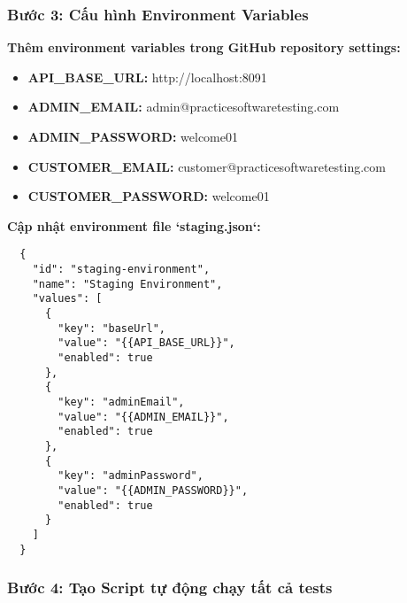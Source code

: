 \documentclass[12pt,a4paper]{article}
\begin{document}
  \subsubsection{Bước 3: Cấu hình Environment Variables}

  \textbf{Thêm environment variables trong GitHub repository settings:}
  \begin{itemize}
  \item \textbf{API\_BASE\_URL:} http://localhost:8091
  \item \textbf{ADMIN\_EMAIL:} admin@practicesoftwaretesting.com
  \item \textbf{ADMIN\_PASSWORD:} welcome01
  \item \textbf{CUSTOMER\_EMAIL:} customer@practicesoftwaretesting.com
  \item \textbf{CUSTOMER\_PASSWORD:} welcome01
  \end{itemize}

  \textbf{Cập nhật environment file `staging.json`:}
  \begin{lstlisting}
  {
    "id": "staging-environment",
    "name": "Staging Environment",
    "values": [
      {
        "key": "baseUrl",
        "value": "{{API_BASE_URL}}",
        "enabled": true
      },
      {
        "key": "adminEmail",
        "value": "{{ADMIN_EMAIL}}",
        "enabled": true
      },
      {
        "key": "adminPassword",
        "value": "{{ADMIN_PASSWORD}}",
        "enabled": true
      }
    ]
  }
  \end{lstlisting}

  \subsubsection{Bước 4: Tạo Script tự động chạy tất cả tests}
\end{document}
